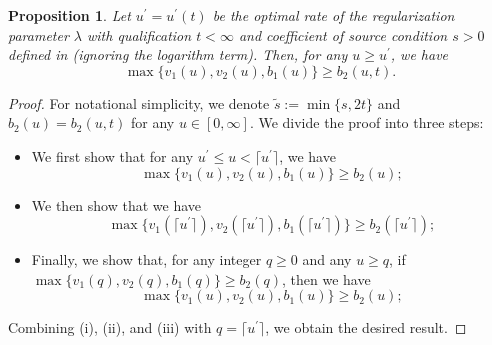 \documentclass{article}
\theoremstyle{plain}
\newtheorem{proposition}[theorem]{Proposition}
\theoremstyle{definition}
\theoremstyle{remark}
\begin{document}
\begin{appendix}
\begin{proposition}\label{prop_e_3}
    Let $u^{\prime} = u^{\prime}(t)$ be the optimal rate of the regularization parameter $\lambda$ with qualification $t < \infty$ and coefficient of source condition $s>0$ defined in \cite{lu2024saturation} (ignoring the logarithm term). Then, for any $u \geq u^{\prime}$, we have
    $$
    \max\{v_1(u), v_2(u), b_1(u)\} \geq b_2(u, t).
    $$
\end{proposition}
\begin{proof}
For notational simplicity, we denote  $\tilde{s}:=\min\{s, 2t\}$  and $b_2(u)=b_2(u, t)$ for any $u \in [0, \infty]$.
 We divide the proof into three steps:
 \begin{itemize}
     \item[(i)] We first show that for any $u^{\prime} \leq u < \lceil u^{\prime} \rceil$, we have
     $$
    \max\{v_1(u), v_2(u), b_1(u)\} \geq b_2(u);
    $$
     
     \item[(ii)] We then show that we have
        $$
        \max\{v_1(\lceil u^{\prime} \rceil), v_2(\lceil u^{\prime} \rceil), b_1(\lceil u^{\prime} \rceil)\} \geq b_2(\lceil u^{\prime} \rceil);
        $$
    \item[(iii)] Finally, we show that, for any integer $q \geq 0$ and any $u\geq q$, if $\max\{v_1(q), v_2(q), b_1(q)\} \geq b_2(q)$, then we have
    $$
        \max\{v_1(u), v_2(u), b_1(u)\} \geq b_2(u);
    $$
 \end{itemize}
Combining (i), (ii), and (iii) with $q=\lceil u^{\prime} \rceil$, we obtain the desired result.



\end{proof}
\end{appendix}
\end{document}
